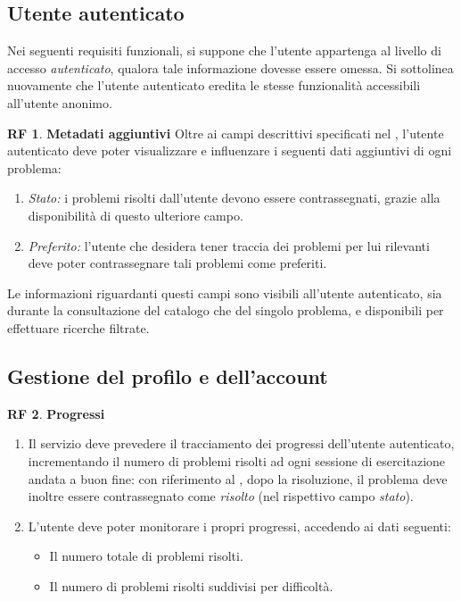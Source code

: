 \documentclass[11pt, a4paper]{article}
\theoremstyle{definition}
\newtheorem{funcreq}{RF} %
\begin{document}
\begin{center}
    \section*{Utente autenticato}
\end{center}

Nei seguenti requisiti funzionali, si suppone che l'utente appartenga al livello
di accesso \textit{autenticato}, qualora tale informazione dovesse essere omessa.
Si sottolinea nuovamente che l'utente autenticato eredita le stesse funzionalità
accessibili all'utente anonimo.
\\
\begin{funcreq}
    \textbf{Metadati aggiuntivi }
    Oltre ai campi descrittivi specificati nel \textcolor{blue}{},
    l'utente autenticato deve poter visualizzare e influenzare i seguenti dati aggiuntivi di
    ogni problema:
    \begin{enumerate}
        \item \textit{Stato:} i problemi risolti dall'utente devono essere contrassegnati,
        grazie alla disponibilità di questo ulteriore campo.
    
        \item \textit{Preferito:} l'utente che desidera tener traccia dei problemi
        per lui rilevanti deve poter contrassegnare tali problemi come preferiti.
    \end{enumerate}
    Le informazioni riguardanti questi campi sono visibili all'utente autenticato,
    sia durante la consultazione del catalogo che del singolo problema, e disponibili
    per effettuare ricerche filtrate.
\end{funcreq}


\subsection{Gestione del profilo e dell'account}
\begin{funcreq}
\label{stats}
\textbf{Progressi }
\begin{enumerate}
    \item Il servizio deve prevedere il tracciamento dei progressi dell'utente
    autenticato, incrementando il numero di problemi risolti ad ogni sessione
    di esercitazione andata a buon fine: con riferimento al
    \textcolor{blue}{},
    dopo la risoluzione, il problema deve inoltre essere contrassegnato come
    \textit{risolto} (nel rispettivo campo \textit{stato}).

    \item L'utente deve poter monitorare i propri progressi, accedendo ai dati
    seguenti:
    \begin{itemize}
        \item Il numero totale di problemi risolti.
        \item Il numero di problemi risolti suddivisi per difficoltà.
    \end{itemize}
\end{enumerate}
\end{funcreq}
\end{document}
